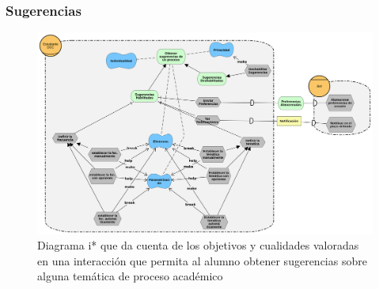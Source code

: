     \subsubsection{Sugerencias}
        \begin{figure}[ht]
            \centering
            \includegraphics[width=\textwidth]{media/diagramas/i_star/Sugerencias.png}
            \caption[Diagrama i* Sugerencias]{Diagrama i* que da cuenta de los objetivos y cualidades valoradas en una interacción que permita al alumno obtener sugerencias sobre alguna temática de proceso académico}
            \label{d:i_star-sugerencias}
        \end{figure}

